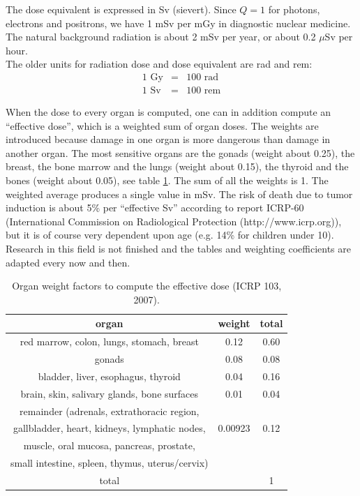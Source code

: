 The dose equivalent is expressed in Sv (sievert). Since $Q = 1$ for photons,
electrons and positrons, we have 1 mSv per mGy in diagnostic nuclear
medicine. The natural background radiation is about 2 mSv per year, or
about 0.2 $\mu$Sv per hour.\\

The older units for radiation dose and dose equivalent are rad and rem:
\begin{eqnarray}
  \mbox{1 Gy} & = & \mbox{100 rad}\\
  \mbox{1 Sv} & = & \mbox{100 rem}
\end{eqnarray}

When the dose to every organ is computed, one can in addition compute
an ``effective dose'', which is a weighted sum of organ doses. The
weights are introduced because damage in one organ is more dangerous
than damage in another organ. The most sensitive organs are the gonads
(weight about 0.25), the breast, the bone marrow and the lungs (weight
about 0.15), the thyroid and the bones (weight about 0.05), see table
\ref{tab:effdose}. The sum of all the weights is 1. The weighted
average produces a single value in mSv. The risk of death due to tumor
induction is about 5\% per ``effective Sv'' according to report
ICRP-60 (International Commission on Radiological Protection
(http://www.icrp.org)), but it is of course very dependent upon age
(e.g. 14\% for children under 10). Research in this field is not
finished and the tables and weighting coefficients are adapted every
now and then.

\begin{table}[h]
\begin{center}
\caption{Organ weight factors to compute the effective dose (ICRP 103, 2007).}
\label{tab:effdose}
\begin{tabular}{|c|c|c|}
  \hline
  organ & weight & total\\
  \hline
  red marrow, colon, lungs, stomach, breast & 0.12 & 0.60\\
  \hline
  gonads & 0.08 & 0.08\\
  \hline
  bladder, liver, esophagus, thyroid & 0.04 & 0.16\\
  \hline
  brain, skin, salivary glands, bone surfaces & 0.01 & 0.04\\
  \hline
  remainder (adrenals, extrathoracic region, & & \\
  gallbladder, heart, kidneys, lymphatic nodes, & 0.00923& 0.12\\
  muscle, oral mucosa, pancreas, prostate, & & \\
  small intestine, spleen, thymus, uterus/cervix) & &\\
  \hline
  total  & & 1 \\
  \hline
\end{tabular}
\end{center}
\end{table}


